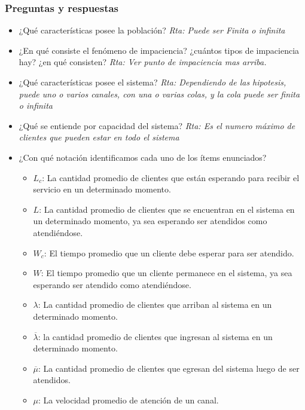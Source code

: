 \documentclass{article}
\begin{document}
\subsubsection{Preguntas y respuestas}
\begin{itemize}
    \item ¿Qué características posee la población?
        \newline\textit{Rta: Puede ser Finita o infinita}
    \item ¿En qué consiste el fenómeno de impaciencia? ¿cuántos tipos de impaciencia hay? ¿en qué consisten?
        \newline\textit{Rta: Ver punto de impaciencia mas arriba.}
    \item ¿Qué características posee el sistema?
        \newline\textit{Rta: Dependiendo de las hipotesis, puede uno o varios canales, con una o varias colas, y la cola puede ser finita o infinita}
    \item ¿Qué se entiende por capacidad del sistema?
        \newline\textit{Rta: Es el numero máximo de clientes que pueden estar en todo el sistema}
    \item ¿Con qué notación identificamos cada uno de los ítems enunciados?
        \begin{itemize}
            \item \(L_c\): La cantidad promedio de clientes que están esperando para recibir el servicio en un determinado momento.
            \item \(L\): La cantidad promedio de clientes que se encuentran en el sistema en un determinado momento, ya sea esperando ser atendidos como atendiéndose.
            \item \(W_c\): El tiempo promedio que un cliente debe esperar para ser atendido.
            \item \(W\): El tiempo promedio que un cliente permanece en el sistema, ya sea esperando ser atendido como atendiéndose.
            \item \(\lambda\): La cantidad promedio de clientes que arriban al sistema en un determinado momento.
            \item $\overline{\lambda}$: la cantidad promedio de clientes que ingresan al sistema en un determinado momento.
            \item $\overline{\mu}$: La cantidad promedio de clientes que egresan del sistema luego de ser atendidos.
            \item \(\mu\): La velocidad promedio de atención de un canal.

\end{itemize}
\end{itemize}
\end{document}
